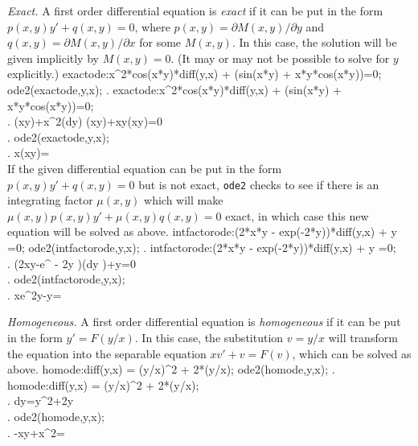 \noindent
\textit{Exact.}\quad
A first order differential equation is 
\textit{exact} if it can be put in the form $p(x,y)y'+q(x,y)=0$, where
$p(x,y) = \partial M(x,y) /\partial y$ and 
$q(x,y) = \partial M(x,y) /\partial x$ for some $M(x,y)$.  In this
case, the solution will be given implicitly by $M(x,y)=0$.
(It may or may not be possible to solve for $y$ explicitly.)
\beginmaximasession
exactode:x^2*cos(x*y)*diff(y,x) + (sin(x*y) + x*y*cos(x*y))=0;
ode2(exactode,y,x);
\maximatexsession
{}.  exactode:x^2*cos(x*y)*diff(y,x) + (sin(x*y) + x*y*cos(x*y))=0; \\
.   \sin \left(x\*y\right)+x^{2}\*\left({{d}}\*y\right)
 \*\cos \left(x\*y\right)+x\*y\*\cos \left(x\*y\right)=0 \\
.  ode2(exactode,y,x); \\
.   x\*\sin \left(x\*y\right)= \\
\endmaximasession
\noindent
If the given differential equation can be put in the form 
$p(x,y)y' + q(x,y)=0$ but is not exact, \texttt{ode2} checks to see if
there is an integrating factor $\mu(x,y)$ which will make
$\mu(x,y)p(x,y)y' + \mu(x,y)q(x,y)=0$ exact, in which case this new
equation will be solved as above.
\beginmaximasession
intfactorode:(2*x*y - exp(-2*y))*diff(y,x) + y =0;
ode2(intfactorode,y,x);
\maximatexsession
{}.  intfactorode:(2*x*y - exp(-2*y))*diff(y,x) + y =0; \\
.   \left(2\*x\*y-e^ {- 2\*y }\right)\*\left({{d}}\*y
 \right)+y=0 \\
.  ode2(intfactorode,y,x); \\
.   x\*e^{2\*y}-\log y= \\
\endmaximasession

\smallskip

\noindent
\textit{Homogeneous.}\quad
A first order differential equation is \textit{homogeneous} if it can
be put in the form $y'=F(y/x)$.  In this case, the substitution
$v=y/x$ will transform the equation into the separable equation
$xv'+v=F(v)$, which can be solved as above.
\beginmaximasession
homode:diff(y,x) = (y/x)^2 + 2*(y/x);
ode2(homode,y,x);
\maximatexsession
{}.  homode:diff(y,x) = (y/x)^2 + 2*(y/x); \\
.   {{d}}\*y={{y^{2}}}+{{2\*y}} \\
.  ode2(homode,y,x); \\
.   -{{x\*y+x^{2}}}= \\
\endmaximasession

